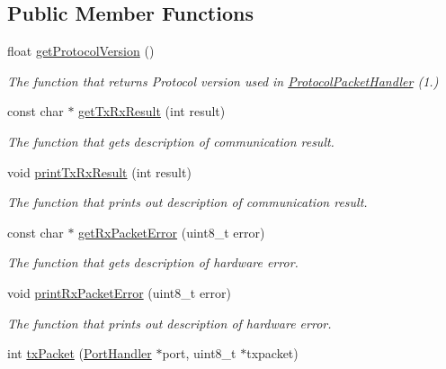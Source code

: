 \subsection*{Public Member Functions}
\begin{DoxyCompactItemize}
\item 
float \hyperlink{classmercury_1_1_protocol_packet_handler_a79099f3c0ebc35a9198ca88ab3bfb284}{get\+Protocol\+Version} ()
\begin{DoxyCompactList}\small\item\em The function that returns Protocol version used in \hyperlink{classmercury_1_1_protocol_packet_handler}{Protocol\+Packet\+Handler} (1.) \end{DoxyCompactList}\item 
const char $\ast$ \hyperlink{classmercury_1_1_protocol_packet_handler_a9c963a7033794c15b4d51ccf7455897f}{get\+Tx\+Rx\+Result} (int result)
\begin{DoxyCompactList}\small\item\em The function that gets description of communication result. \end{DoxyCompactList}\item 
void \hyperlink{classmercury_1_1_protocol_packet_handler_a24cb94d59c1a0f1fcb70a85e1a8465b2}{print\+Tx\+Rx\+Result} (int result)
\begin{DoxyCompactList}\small\item\em The function that prints out description of communication result. \end{DoxyCompactList}\item 
const char $\ast$ \hyperlink{classmercury_1_1_protocol_packet_handler_a0567896a3552cd6bea62e81f2b42741e}{get\+Rx\+Packet\+Error} (uint8\+\_\+t error)
\begin{DoxyCompactList}\small\item\em The function that gets description of hardware error. \end{DoxyCompactList}\item 
void \hyperlink{classmercury_1_1_protocol_packet_handler_ac4a6d381c2222446cfa558a9fb675c1c}{print\+Rx\+Packet\+Error} (uint8\+\_\+t error)
\begin{DoxyCompactList}\small\item\em The function that prints out description of hardware error. \end{DoxyCompactList}\item 
int \hyperlink{classmercury_1_1_protocol_packet_handler_a245f01395d9684bc58788e8a06de3ffc}{tx\+Packet} (\hyperlink{classmercury_1_1_port_handler}{Port\+Handler} $\ast$port, uint8\+\_\+t $\ast$txpacket)

\end{DoxyCompactItemize}
